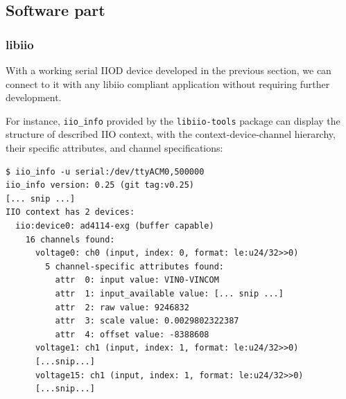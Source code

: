 \documentclass{thesis}
\newcommand{\todo}[1]{{\color{red}TODO: #1}}
\begin{document}



\newpage
\subsection{Software part}

\subsubsection{libiio}

With a working serial IIOD device developed in the previous section, we can connect to it with any libiio compliant application without requiring further development.

For instance, \texttt{iio\_info} provided by the \texttt{libiio-tools} package can display the structure of described IIO context, with the context-device-channel hierarchy, their specific attributes, and channel specifications:

\begin{verbatim}
$ iio_info -u serial:/dev/ttyACM0,500000
iio_info version: 0.25 (git tag:v0.25)
[... snip ...]
IIO context has 2 devices:
  iio:device0: ad4114-exg (buffer capable)
    16 channels found:
      voltage0: ch0 (input, index: 0, format: le:u24/32>>0)
        5 channel-specific attributes found:
          attr  0: input value: VIN0-VINCOM
          attr  1: input_available value: [... snip ...]
          attr  2: raw value: 9246832
          attr  3: scale value: 0.0029802322387
          attr  4: offset value: -8388608
      voltage1: ch1 (input, index: 1, format: le:u24/32>>0)
      [...snip...]
      voltage15: ch1 (input, index: 1, format: le:u24/32>>0)
      [...snip...]
\end{verbatim}
\end{document}
